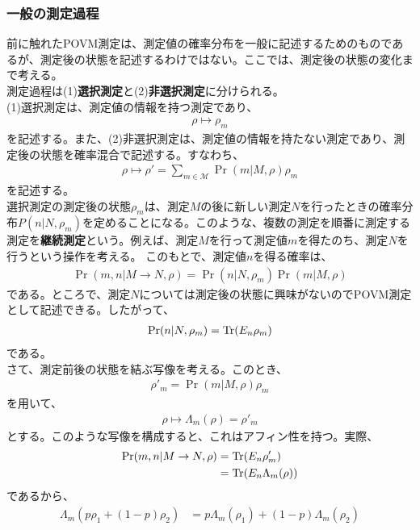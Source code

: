 \documentclass[a4paper,11pt]{jsarticle}
\numberwithin{equation}{section}
\begin{document}
\subsubsection{一般の測定過程}
前に触れたPOVM測定は、測定値の確率分布を一般に記述するためのものであるが、測定後の状態を記述するわけではない。ここでは、測定後の状態の変化まで考える。\\
測定過程は(1)\textbf{選択測定}と(2)\textbf{非選択測定}に分けられる。\\
(1)選択測定は、測定値の情報を持つ測定であり、
\begin{align}
    \rho \mapsto \rho_m
\end{align}
を記述する。また、(2)非選択測定は、測定値の情報を持たない測定であり、測定後の状態を確率混合で記述する。すなわち、
\begin{align}
    \rho \mapsto \rho' = \sum_{m \in \mathcal{M}} \Pr(m|M,\rho)\rho_m
\end{align}
を記述する。\\
選択測定の測定後の状態$\rho_m$は、測定$M$の後に新しい測定$N$を行ったときの確率分布$P(n|N,\rho_m)$を定めることになる。このような、複数の測定を順番に測定する測定を\textbf{継続測定}という。例えば、測定$M$を行って測定値$m$を得たのち、測定$N$を行うという操作を考える。
このもとで、測定値$n$を得る確率は、
\begin{align}
    \Pr(m,n|M \to N, \rho) = \Pr(n|N,\rho_m)\Pr(m|M,\rho)
\end{align}
である。ところで、測定$N$については測定後の状態に興味がないのでPOVM測定として記述できる。したがって、
\begin{align}
    \Pr(n|N,\rho_m) = \Tr(E_n\rho_m)
\end{align}
である。\\
さて、測定前後の状態を結ぶ写像を考える。このとき、
\begin{align}
    \rho'_m = \Pr(m|M,\rho)\rho_m
\end{align}
を用いて、
\begin{align}
    \rho \mapsto \Lambda_m(\rho) = \rho'_m
\end{align}
とする。このような写像を構成すると、これはアフィン性を持つ。実際、
\begin{align}
    \Pr(m,n|M \to N, \rho) &= \Tr(E_n\rho'_m)\\
    &= \Tr(E_n\Lambda_m(\rho))
\end{align}
であるから、
\begin{align}
    \Lambda_m(p\rho_1 + (1-p)\rho_2) &= p\Lambda_m(\rho_1) + (1-p)\Lambda_m(\rho_2)
\end{align}
\end{document}

